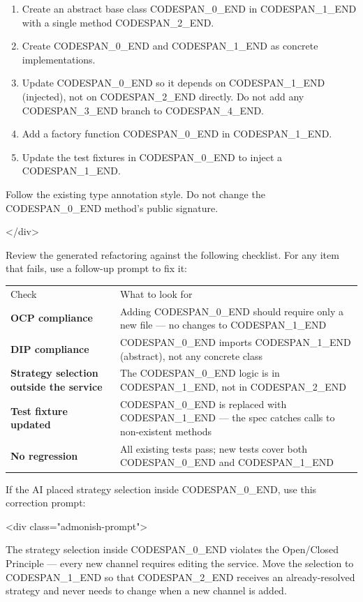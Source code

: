 \documentclass[11pt,a4paper]{book}
\begin{document}
\begin{enumerate}
  \item Create an abstract base class CODESPAN\_0\_END in CODESPAN\_1\_END with a single method CODESPAN\_2\_END.
  \item Create CODESPAN\_0\_END and CODESPAN\_1\_END as concrete implementations.
  \item Update CODESPAN\_0\_END so it depends on CODESPAN\_1\_END (injected), not on CODESPAN\_2\_END directly. Do not add any CODESPAN\_3\_END branch to CODESPAN\_4\_END.
  \item Add a factory function CODESPAN\_0\_END in CODESPAN\_1\_END.
  \item Update the test fixtures in CODESPAN\_0\_END to inject a CODESPAN\_1\_END.
\end{enumerate}

Follow the existing type annotation style. Do not change the CODESPAN\_0\_END method's public signature.

</div>

Review the generated refactoring against the following checklist. For any item that fails, use a follow-up prompt to fix it:

\begin{tabular}{ll}
\hline
Check & What to look for \\
\textbf{OCP compliance} & Adding CODESPAN\_0\_END should require only a new file --- no changes to CODESPAN\_1\_END \\
\textbf{DIP compliance} & CODESPAN\_0\_END imports CODESPAN\_1\_END (abstract), not any concrete class \\
\textbf{Strategy selection outside the service} & The CODESPAN\_0\_END logic is in CODESPAN\_1\_END, not in CODESPAN\_2\_END \\
\textbf{Test fixture updated} & CODESPAN\_0\_END is replaced with CODESPAN\_1\_END --- the spec catches calls to non-existent methods \\
\textbf{No regression} & All existing tests pass; new tests cover both CODESPAN\_0\_END and CODESPAN\_1\_END \\
\hline
\end{tabular}

If the AI placed strategy selection inside CODESPAN\_0\_END, use this correction prompt:

<div class="admonish-prompt">

The strategy selection inside CODESPAN\_0\_END violates the Open/Closed Principle --- every new channel requires editing the service. Move the selection to CODESPAN\_1\_END so that CODESPAN\_2\_END receives an already-resolved strategy and never needs to change when a new channel is added.
\end{document}
